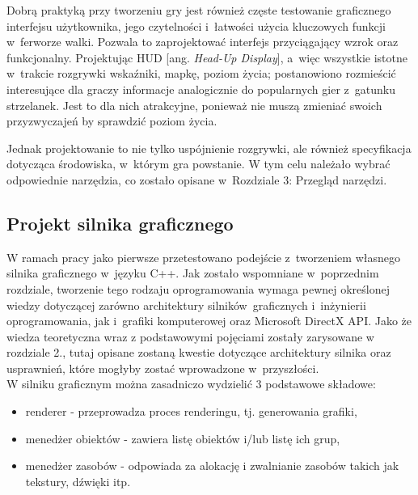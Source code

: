 Dobrą praktyką przy tworzeniu gry jest również częste testowanie graficznego interfejsu użytkownika, jego czytelności i~łatwości użycia kluczowych funkcji w~ferworze walki. Pozwala to zaprojektować interfejs przyciągający wzrok oraz funkcjonalny. Projektując HUD [ang. \emph{Head-Up Display}], a~więc wszystkie istotne w~trakcie rozgrywki wskaźniki, mapkę, poziom życia; postanowiono rozmieścić interesujące dla graczy informacje analogicznie do popularnych gier z~gatunku strzelanek. Jest to dla nich atrakcyjne, ponieważ nie muszą zmieniać swoich przyzwyczajeń by sprawdzić poziom życia. 

Jednak projektowanie to nie tylko uspójnienie rozgrywki, ale również specyfikacja dotycząca środowiska, w~którym gra powstanie. W tym celu należało wybrać odpowiednie narzędzia, co zostało opisane w~Rozdziale 3: Przegląd narzędzi. 

\subsection{Projekt silnika graficznego}

W ramach pracy jako pierwsze przetestowano podejście z~tworzeniem własnego silnika graficznego w~języku C++. Jak zostało wspomniane w~poprzednim rozdziale, tworzenie tego rodzaju oprogramowania wymaga pewnej określonej wiedzy dotyczącej zarówno architektury silników~graficznych i~inżynierii oprogramowania, jak i~grafiki komputerowej oraz Microsoft DirectX API. Jako że wiedza teoretyczna wraz z podstawowymi pojęciami zostały zarysowane w rozdziale 2., tutaj opisane zostaną kwestie dotyczące architektury silnika oraz usprawnień, które mogłyby zostać wprowadzone w~przyszłości.\\

W silniku graficznym można zasadniczo wydzielić 3 podstawowe składowe:
\begin{itemize}
\item renderer - przeprowadza proces renderingu, tj. generowania grafiki,
\item menedżer obiektów - zawiera listę obiektów i/lub listę ich grup,
\item menedżer zasobów - odpowiada za alokację i zwalnianie zasobów takich jak tekstury, dźwięki itp.
\end{itemize}

